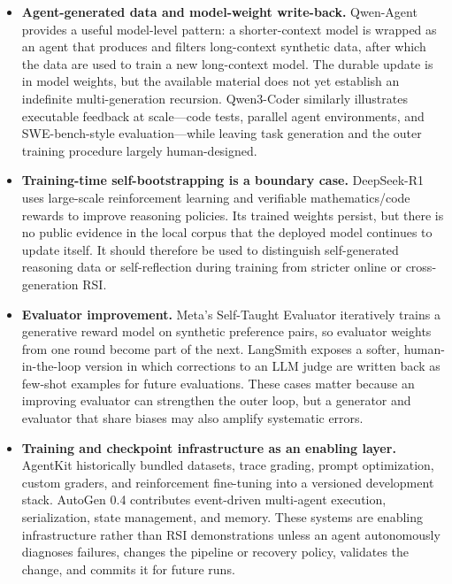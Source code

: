 \begin{itemize}
  \item \textbf{Agent-generated data and model-weight write-back.}
  Qwen-Agent provides a useful model-level pattern: a shorter-context model is
  wrapped as an agent that produces and filters long-context synthetic data,
  after which the data are used to train a new long-context model. The durable
  update is in model weights, but the available material does not yet establish
  an indefinite multi-generation recursion. Qwen3-Coder similarly illustrates
  executable feedback at scale---code tests, parallel agent environments, and
  SWE-bench-style evaluation---while leaving task generation and the outer
  training procedure largely human-designed.

  \item \textbf{Training-time self-bootstrapping is a boundary case.}
  DeepSeek-R1 uses large-scale reinforcement learning and verifiable
  mathematics/code rewards to improve reasoning policies. Its trained weights
  persist, but there is no public evidence in the local corpus that the deployed
  model continues to update itself. It should therefore be used to distinguish
  self-generated reasoning data or self-reflection during training from stricter
  online or cross-generation RSI.

  \item \textbf{Evaluator improvement.}
  Meta's Self-Taught Evaluator iteratively trains a generative reward model on
  synthetic preference pairs, so evaluator weights from one round become part
  of the next. LangSmith exposes a softer, human-in-the-loop version in which
  corrections to an LLM judge are written back as few-shot examples for future
  evaluations. These cases matter because an improving evaluator can strengthen
  the outer loop, but a generator and evaluator that share biases may also
  amplify systematic errors.

  \item \textbf{Training and checkpoint infrastructure as an enabling layer.}
  AgentKit historically bundled datasets, trace grading, prompt optimization,
  custom graders, and reinforcement fine-tuning into a versioned development
  stack. AutoGen 0.4 contributes event-driven multi-agent execution,
  serialization, state management, and memory. These systems are enabling
  infrastructure rather than RSI demonstrations unless an agent autonomously
  diagnoses failures, changes the pipeline or recovery policy, validates the
  change, and commits it for future runs.


\end{itemize}
